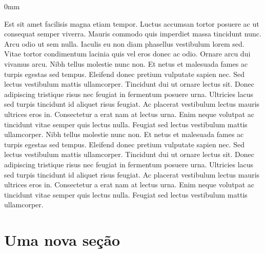 \documentclass[./main.tex]{subfiles}
\begin{document}
\begin{adjustwidth}{\bodytab}{0mm}
\par Est sit amet facilisis magna etiam tempor. Luctus accumsan tortor posuere ac ut consequat semper viverra. Mauris commodo quis imperdiet massa tincidunt nunc. Arcu odio ut sem nulla. Iaculis eu non diam phasellus vestibulum lorem sed. Vitae tortor condimentum lacinia quis vel eros donec ac odio. Ornare arcu dui vivamus arcu. Nibh tellus molestie nunc non. Et netus et malesuada fames ac turpis egestas sed tempus. Eleifend donec pretium vulputate sapien nec. Sed lectus vestibulum mattis ullamcorper. Tincidunt dui ut ornare lectus sit. Donec adipiscing tristique risus nec feugiat in fermentum posuere urna. Ultricies lacus sed turpis tincidunt id aliquet risus feugiat. Ac placerat vestibulum lectus mauris ultrices eros in. Consectetur a erat nam at lectus urna. Enim neque volutpat ac tincidunt vitae semper quis lectus nulla. Feugiat sed lectus vestibulum mattis ullamcorper. Nibh tellus molestie nunc non. Et netus et malesuada fames ac turpis egestas sed tempus. Eleifend donec pretium vulputate sapien nec. Sed lectus vestibulum mattis ullamcorper. Tincidunt dui ut ornare lectus sit. Donec adipiscing tristique risus nec feugiat in fermentum posuere urna. Ultricies lacus sed turpis tincidunt id aliquet risus feugiat. Ac placerat vestibulum lectus mauris ultrices eros in. Consectetur a erat nam at lectus urna. Enim neque volutpat ac tincidunt vitae semper quis lectus nulla. Feugiat sed lectus vestibulum mattis ullamcorper.
\end{adjustwidth}


\section{Uma nova seção} \label{chp1:sec2}
\end{document}

